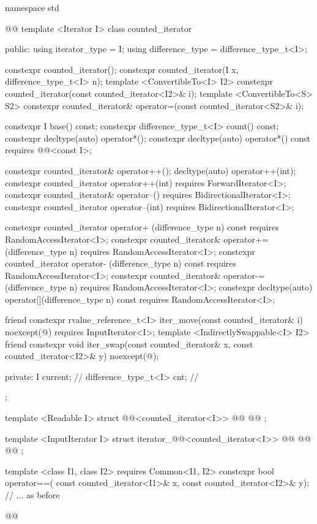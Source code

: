 %
\begin{codeblock}
namespace std { @@
  template <Iterator I>
  class counted_iterator {
  public:
    using iterator_type = I;
    using difference_type = difference_type_t<I>;

    constexpr counted_iterator();
    constexpr counted_iterator(I x, difference_type_t<I> n);
    template <ConvertibleTo<I> I2>
      constexpr counted_iterator(const counted_iterator<I2>& i);
    template <ConvertibleTo<S> S2>
      constexpr counted_iterator& operator=(const counted_iterator<S2>& i);

    constexpr I base() const;
    constexpr difference_type_t<I> count() const;
    constexpr decltype(auto) operator*();
    constexpr decltype(auto) operator*() const
      requires @@<const I>;

    constexpr counted_iterator& operator++();
    decltype(auto) operator++(int);
    constexpr counted_iterator operator++(int)
      requires ForwardIterator<I>;
    constexpr counted_iterator& operator--()
      requires BidirectionalIterator<I>;
    constexpr counted_iterator operator--(int)
      requires BidirectionalIterator<I>;

    constexpr counted_iterator  operator+ (difference_type n) const
      requires RandomAccessIterator<I>;
    constexpr counted_iterator& operator+=(difference_type n)
      requires RandomAccessIterator<I>;
    constexpr counted_iterator  operator- (difference_type n) const
      requires RandomAccessIterator<I>;
    constexpr counted_iterator& operator-=(difference_type n)
      requires RandomAccessIterator<I>;
    constexpr decltype(auto) operator[](difference_type n) const
      requires RandomAccessIterator<I>;

    friend constexpr rvalue_reference_t<I> iter_move(const counted_iterator& i)
      noexcept(@\seebelow@)
        requires InputIterator<I>;
    template <IndirectlySwappable<I> I2>
      friend constexpr void iter_swap(const counted_iterator& x, const counted_iterator<I2>& y)
        noexcept(@\seebelow@);

  private:
    I current; // \expos
    difference_type_t<I> cnt; // \expos
  };

  template <Readable I>
  struct @@<counted_iterator<I>> {
    @@
    @@
  };

  template <InputIterator I>
  struct iterator_@@<counted_iterator<I>>
    @@ {
    @@
    @@
  };

  template <class I1, class I2>
      requires Common<I1, I2>
    constexpr bool operator==(
      const counted_iterator<I1>& x, const counted_iterator<I2>& y);
  // ... as before
}@\removed{\}}@
\end{codeblock}

